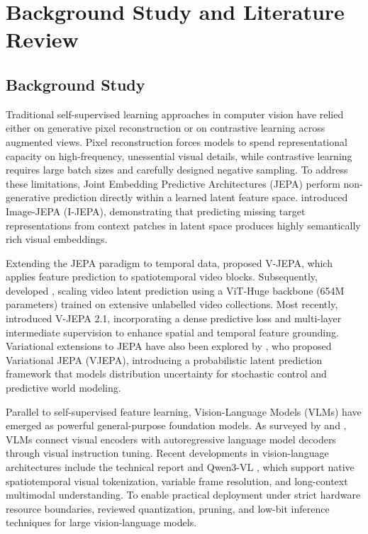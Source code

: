 \chapter{Background Study and Literature Review}

\section{Background Study}

Traditional self-supervised learning approaches in computer vision have relied either on generative pixel reconstruction or on contrastive learning across augmented views. Pixel reconstruction forces models to spend representational capacity on high-frequency, unessential visual details, while contrastive learning requires large batch sizes and carefully designed negative sampling. To address these limitations, Joint Embedding Predictive Architectures (JEPA) perform non-generative prediction directly within a learned latent feature space. \citet{assran2023ijepa} introduced Image-JEPA (I-JEPA), demonstrating that predicting missing target representations from context patches in latent space produces highly semantically rich visual embeddings.

Extending the JEPA paradigm to temporal data, \citet{bardes2024vjepa} proposed V-JEPA, which applies feature prediction to spatiotemporal video blocks. Subsequently, \citet{assran2025vjepa2} developed \vjepaa{}, scaling video latent prediction using a ViT-Huge backbone (654M parameters) trained on extensive unlabelled video collections. Most recently, \citet{murlabadia2026vjepa21} introduced V-JEPA 2.1, incorporating a dense predictive loss and multi-layer intermediate supervision to enhance spatial and temporal feature grounding. Variational extensions to JEPA have also been explored by \citet{huang2026vjepa}, who proposed Variational JEPA (VJEPA), introducing a probabilistic latent prediction framework that models distribution uncertainty for stochastic control and predictive world modeling.

Parallel to self-supervised feature learning, Vision-Language Models (VLMs) have emerged as powerful general-purpose foundation models. As surveyed by \citet{bordes2024vlm} and \citet{zhang2023vlmsurvey}, VLMs connect visual encoders with autoregressive language model decoders through visual instruction tuning. Recent developments in vision-language architectures include the \qwenvl{} technical report \citep{bai2025qwen2vl} and Qwen3-VL \citep{qwen2025qwen3vl}, which support native spatiotemporal visual tokenization, variable frame resolution, and long-context multimodal understanding. To enable practical deployment under strict hardware resource boundaries, \citet{pathak2026efficientvlms} reviewed quantization, pruning, and low-bit inference techniques for large vision-language models.

